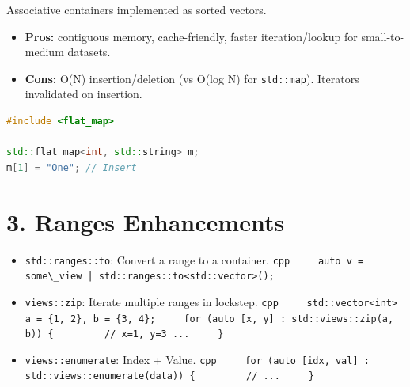 Associative containers implemented as sorted vectors.

\begin{itemize}
\tightlist
\item
  \textbf{Pros:} contiguous memory, cache-friendly, faster
  iteration/lookup for small-to-medium datasets.
\item
  \textbf{Cons:} O(N) insertion/deletion (vs O(log N) for
  \passthrough{\lstinline!std::map!}). Iterators invalidated on
  insertion.
\end{itemize}

\begin{lstlisting}[language={C++}]
#include <flat_map>

std::flat_map<int, std::string> m;
m[1] = "One"; // Insert
\end{lstlisting}

\hypertarget{ranges-enhancements}{%
\section{3. Ranges Enhancements}\label{ranges-enhancements}}

\begin{itemize}
\tightlist
\item
  \passthrough{\lstinline!std::ranges::to!}: Convert a range to a
  container.
  \passthrough{\lstinline!cpp     auto v = some\_view | std::ranges::to<std::vector>();!}
\item
  \passthrough{\lstinline!views::zip!}: Iterate multiple ranges in
  lockstep.
  \passthrough{\lstinline!cpp     std::vector<int> a = \{1, 2\}, b = \{3, 4\};     for (auto [x, y] : std::views::zip(a, b)) \{         // x=1, y=3 ...     \}!}
\item
  \passthrough{\lstinline!views::enumerate!}: Index + Value.
  \passthrough{\lstinline!cpp     for (auto [idx, val] : std::views::enumerate(data)) \{         // ...     \}!}
\end{itemize}
